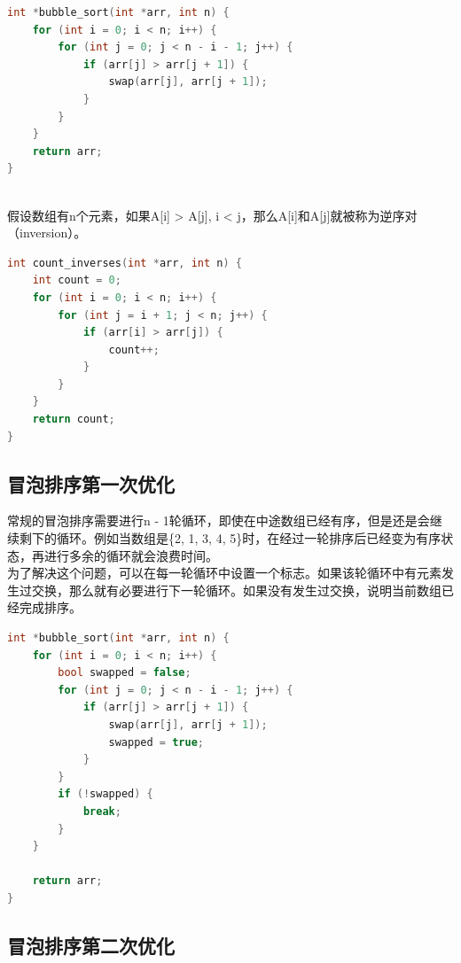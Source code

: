 
\begin{lstlisting}[language=C++]
int *bubble_sort(int *arr, int n) {
	for (int i = 0; i < n; i++) {
		for (int j = 0; j < n - i - 1; j++) {
			if (arr[j] > arr[j + 1]) {
				swap(arr[j], arr[j + 1]);
			}
		}
	}
	return arr;
}
\end{lstlisting}

\vspace{0.5cm}

\\

假设数组有n个元素，如果A[i] > A[j], i < j，那么A[i]和A[j]就被称为逆序对（inversion）。

\begin{lstlisting}[language=C++]
int count_inverses(int *arr, int n) {
	int count = 0;
	for (int i = 0; i < n; i++) {
		for (int j = i + 1; j < n; j++) {
			if (arr[i] > arr[j]) {
				count++;
			}
		}
	}
	return count;
}
\end{lstlisting}

\vspace{0.5cm}

\subsection{冒泡排序第一次优化}

常规的冒泡排序需要进行n - 1轮循环，即使在中途数组已经有序，但是还是会继续剩下的循环。例如当数组是\{2, 1, 3, 4, 5\}时，在经过一轮排序后已经变为有序状态，再进行多余的循环就会浪费时间。\\

为了解决这个问题，可以在每一轮循环中设置一个标志。如果该轮循环中有元素发生过交换，那么就有必要进行下一轮循环。如果没有发生过交换，说明当前数组已经完成排序。\\


\begin{lstlisting}[language=C++]
int *bubble_sort(int *arr, int n) {
	for (int i = 0; i < n; i++) {
		bool swapped = false;
		for (int j = 0; j < n - i - 1; j++) {
			if (arr[j] > arr[j + 1]) {
				swap(arr[j], arr[j + 1]);
				swapped = true;
			}
		}
		if (!swapped) {
			break;
		}
	}

	return arr;
}
\end{lstlisting}

\vspace{0.5cm}

\subsection{冒泡排序第二次优化}

